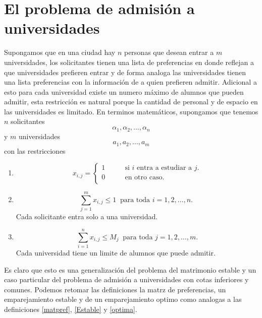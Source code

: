 \section{El problema de admisión a universidades}
Supongamos que en una ciudad hay $n$ personas que desean entrar a $m$ universidades, los solicitantes tienen una lista de preferencias en donde reflejan a que universidades prefieren entrar y de forma analoga las universidades tienen una lista preferencias con la información de a quien prefieren admitir. Adicional a esto para cada universidad existe un numero máximo de alumnos que pueden admitir, esta restricción es natural porque la cantidad de personal y de espacio en las universidades es limitado. 
En terminos matemáticos, supongamos que tenemos $n$ solicitantes $$\alpha_1,\alpha_2,\ldots,\alpha_n$$ y $m$ universidades $$a_1, a_2,\ldots,a_m$$ con las restricciones
\begin{enumerate}
\item \begin{equation} \label{2r1}
x_{i,j}= 
\begin{cases}
1 & \qquad \text{si $i$ entra a estudiar a $j$.} \\
0 &\qquad\text{en otro caso.}\ \\ 
\end{cases} \end{equation}
\item \begin{equation} \label{2r2}
\sum_{j=1}^{m}x_{i,j} \leq1 \ \text{ para toda $i=1,2,\ldots,n$. }
\end{equation} Cada solicitante entra solo a una universidad. 
\item \begin{equation} \label{2r3}
\sum_{i=1}^{n} x_{i,j} \leq M_j\ \text{ para toda $j=1,2,\dots,m$.} 
\end{equation}
Cada universidad tiene un limite de alumnos que puede admitir. 
\end{enumerate}

Es claro que esto es una generalización del problema del matrimonio estable y un caso particular del problema de admisión a universidades con cotas inferiores y comunes. Podemos retomar las definiciones la matrz de preferencias, un emparejamiento estable y de un emparejamiento optimo como analogas a las definiciones \ref{matpref}, \ref{Estable} y \ref{optima}.

